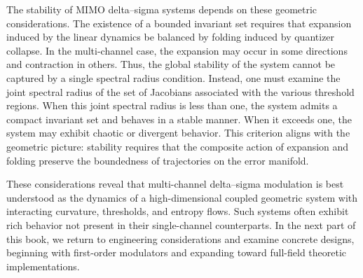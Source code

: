 The stability of MIMO delta--sigma systems depends on these geometric considerations. The existence of a bounded invariant set requires that expansion induced by the linear dynamics be balanced by folding induced by quantizer collapse. In the multi-channel case, the expansion may occur in some directions and contraction in others. Thus, the global stability of the system cannot be captured by a single spectral radius condition. Instead, one must examine the joint spectral radius of the set of Jacobians associated with the various threshold regions. When this joint spectral radius is less than one, the system admits a compact invariant set and behaves in a stable manner. When it exceeds one, the system may exhibit chaotic or divergent behavior. This criterion aligns with the geometric picture: stability requires that the composite action of expansion and folding preserve the boundedness of trajectories on the error manifold.

These considerations reveal that multi-channel delta--sigma modulation is best understood as the dynamics of a high-dimensional coupled geometric system with interacting curvature, thresholds, and entropy flows. Such systems often exhibit rich behavior not present in their single-channel counterparts. In the next part of this book, we return to engineering considerations and examine concrete designs, beginning with first-order modulators and expanding toward full-field theoretic implementations.


